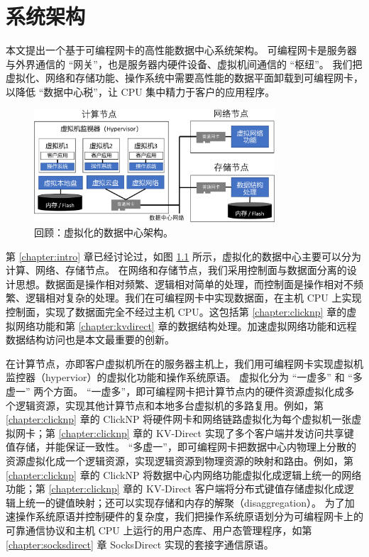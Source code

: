 \chapter{系统架构}

本文提出一个基于可编程网卡的高性能数据中心系统架构。
可编程网卡是服务器与外界通信的 ``网关''，也是服务器内硬件设备、虚拟机间通信的 ``枢纽''。
我们把虚拟化、网络和存储功能、操作系统中需要高性能的数据平面卸载到可编程网卡，以降低 ``数据中心税''，让 CPU 集中精力于客户的应用程序。


\begin{figure}[htbp]
	\centering
	\includegraphics[width=0.8\textwidth]{figures/virt_arch.pdf}
	\caption{回顾：虚拟化的数据中心架构。}
	\label{arch:fig:virt-architecture}
\end{figure}

第 \ref{chapter:intro} 章已经讨论过，如图 \ref{arch:fig:virt-architecture} 所示，虚拟化的数据中心主要可以分为计算、网络、存储节点。
在网络和存储节点，我们采用控制面与数据面分离的设计思想。数据面是操作相对频繁、逻辑相对简单的处理，而控制面是操作相对不频繁、逻辑相对复杂的处理。我们在可编程网卡中实现数据面，在主机 CPU 上实现控制面，实现了数据面完全不经过主机 CPU。这包括第 \ref{chapter:clicknp} 章的虚拟网络功能和第 \ref{chapter:kvdirect} 章的数据结构处理。加速虚拟网络功能和远程数据结构访问也是本文最重要的创新。

在计算节点，亦即客户虚拟机所在的服务器主机上，我们用可编程网卡实现虚拟机监控器（hypervior）的虚拟化功能和操作系统原语。
虚拟化分为 ``一虚多'' 和 ``多虚一'' 两个方面。
``一虚多''，即可编程网卡把计算节点内的硬件资源虚拟化成多个逻辑资源，实现其他计算节点和本地多台虚拟机的多路复用。例如，第 \ref{chapter:clicknp} 章的 ClickNP 将硬件网卡和网络链路虚拟化为每个虚拟机一张虚拟网卡；第 \ref{chapter:clicknp} 章的 KV-Direct 实现了多个客户端并发访问共享键值存储，并能保证一致性。
``多虚一''，即可编程网卡把数据中心内物理上分散的资源虚拟化成一个逻辑资源，实现逻辑资源到物理资源的映射和路由。例如，第 \ref{chapter:clicknp} 章的 ClickNP 将数据中心内网络功能虚拟化成逻辑上统一的网络功能；第 \ref{chapter:clicknp} 章的 KV-Direct 客户端将分布式键值存储虚拟化成逻辑上统一的键值映射；还可以实现存储和内存的解聚（disaggregation）。
为了加速操作系统原语并控制硬件的复杂度，我们把操作系统原语划分为可编程网卡上的可靠通信协议和主机 CPU 上运行的用户态库、用户态管理程序，如第 \ref{chapter:socksdirect} 章 SocksDirect 实现的套接字通信原语。

